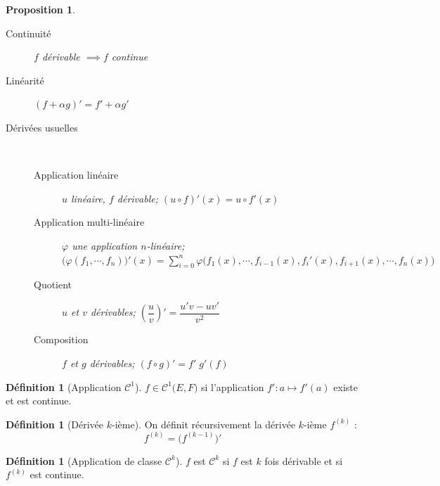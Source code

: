 \documentclass[11pt,a4paper]{report}
\newtheorem{prop}[theorem]{Proposition}
\theoremstyle{definition}
\newtheorem{dfn}[theorem]{Définition}
\begin{document}
\begin{prop}
\begin{description}
    \item[Continuité] $f$ dérivable $\implies f$ continue
    \item[Linéarité] $\left( f + \alpha g \right)' = f' + \alpha g'$
    \item[Dérivées usuelles] \hfill \\[-0.5cm]
        \begin{description}
            \item[Application linéaire] $u$ linéaire, $f$ dérivable; $\left( u \circ f \right)'(x) = u\circ f'(x)$
            \item[Application multi-linéaire] $\varphi$ une application $n$-linéaire;\\ 
            $\bigg( \varphi (f_1, \cdots, f_n) \bigg)'(x) = \sum_{i=0}^n \varphi \bigg( f_1(x), \cdots, f_{i-1}(x), f_i'(x),f_{i+1}(x), \cdots , f_n(x) \bigg)$
            \item[Quotient] $u$ et $v$ dérivables; $\left( \dfrac{u}{v} \right)' = \dfrac{u'v - uv'}{v^2}$
            \item[Composition] $f$ et $g$ dérivables; $\left( f \circ g \right)' = f'\; g'(f)$
        \end{description}
\end{description}
\end{prop}

\begin{dfn}[Application $\mathcal{C}^1$]
$f \in \mathcal{C}^1\big( E,F \big)$ si l'application $f' : a \mapsto f'(a)$ existe et est continue.
\end{dfn}


\begin{dfn}[Dérivée $k$-ième]
On définit récursivement la dérivée $k$-ième $f^{(k)}$ : 
\begin{equation}
    f^{(k)}=\big( f^{(k-1)} \big) '
\end{equation}
\end{dfn}
\begin{dfn}[Application de classe $\mathcal{C}^k$]
$f$ est $\mathcal{C}^k$ si $f$ est $k$ fois dérivable et si $f^{(k)}$ est continue.
\end{dfn}
\end{document}
